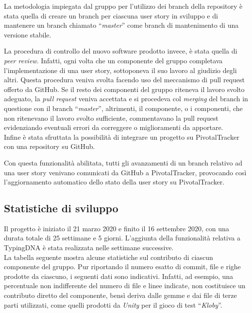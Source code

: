 La metodologia impiegata dal gruppo per l'utilizzo dei branch della
repository è stata quella di creare un branch per ciascuna user story
in sviluppo e di mantenere un branch chiamato ``\textit{master}'' come
branch di mantenimento di una versione stabile.

La procedura di controllo del nuovo software prodotto invece, è stata quella
di \textit{peer review}. Infatti, ogni volta che un componente
del gruppo completava l'implementazione di una user story, sottoponeva
il suo lavoro al giudizio degli altri. Questa procedura veniva svolta
facendo uso del meccanismo di pull request offerto da
GitHub. Se il resto dei componenti del gruppo riteneva il
lavoro svolto adeguato, la \textit{pull request} veniva accettata e si
procedeva col \textit{merging} del branch in questione con il branch
``\textit{master}'', altrimenti, il componente, o i componenti, che
non ritenevano il lavoro svolto sufficiente, commentavano la
pull request evidenziando eventuali errori da correggere o
miglioramenti da apportare.\\

Infine è stata sfruttata la possibilità di integrare un progetto su
PivotalTracker con una repository su GitHub.

Con questa funzionalità abilitata, tutti gli avanzamenti di un branch
relativo ad una user story venivano comunicati da GitHub a
PivotalTracker, provocando così l'aggiornamento automatico
dello stato della user story su PivotalTracker.

\subsection{Statistiche di sviluppo}

Il progetto è iniziato il 21 marzo 2020 e finito il 16 settembre 2020, con una durata totale di 25 settimane e 5 giorni. L'aggiunta della funzionalità relativa a TypingDNA è stata realizzata nelle settimane successive.\\

La tabella seguente mostra alcune statistiche sul contributo di
ciascun componente del gruppo. Pur riportando il numero esatto di
commit, file e righe prodotte da ciascuno, i seguenti dati sono
indicativi. Infatti, ad esempio, una percentuale non indifferente del
numero di file e linee indicate, non costituisce un contributo diretto
del componente, bensì deriva dalle gemme e dai file di terze parti
utilizzati, come quelli prodotti da \textit{Unity} per il
gioco di test ``\textit{Kloby}''.

